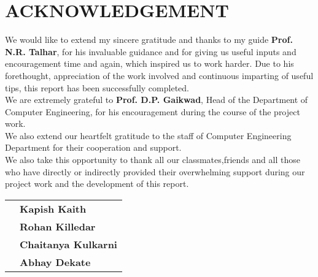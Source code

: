 \chapter*{\Huge\textbf{ACKNOWLEDGEMENT}}

 We would like to extend my sincere gratitude and thanks to my guide \textbf{Prof. N.R. Talhar}, for his invaluable guidance and for giving us useful inputs and encouragement time and again, which inspired us to work harder.  Due to his forethought, appreciation of the work involved and continuous imparting of useful tips, this report has been successfully completed.\\

\noindent
We are extremely grateful to \textbf{Prof. D.P. Gaikwad}, Head of the Department of Computer Engineering, for his  encouragement during the course of the project work.\\   

\noindent
We also extend our heartfelt gratitude to the staff of Computer Engineering Department for their cooperation and support. \\

\noindent
We also take this opportunity to thank all our classmates,friends and all those who have directly or indirectly provided their overwhelming support during  our project work and the development of this report.\\






\vspace{0.5in}
\begin{tabular}{ll}
 & \hspace{3.5in} \bf Kapish Kaith\\
 & \hspace{3.5in} \bf Rohan Killedar\\
 & \hspace{3.5in} \bf Chaitanya Kulkarni\\
 & \hspace{3.5in} \bf Abhay Dekate\\
\end{tabular}